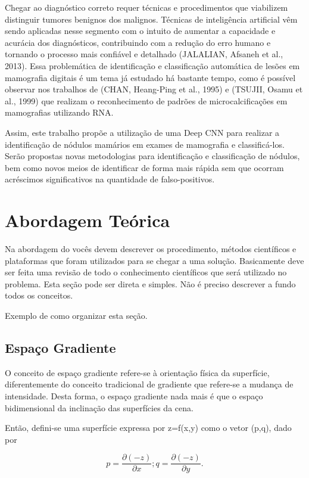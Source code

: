 \documentclass[
	12pt,				%
	openright,			%
	oneside,			%
	a4paper,			%
	brazil,				%
	]{abntex2}
\begin{document}
    Chegar ao diagnóstico correto requer técnicas e procedimentos que viabilizem distinguir tumores benignos dos malignos. Técnicas de inteligência artificial vêm sendo aplicadas nesse segmento com o intuito de aumentar a capacidade e acurácia dos diagnósticos, contribuindo com a redução do erro humano e tornando o processo mais confiável e detalhado (JALALIAN, Afsaneh et al., 2013). 
    Essa problemática de identificação e classificação automática de lesões em mamografia digitais é um tema já estudado há bastante tempo, como é possível observar nos trabalhos de (CHAN, Heang-Ping et al., 1995) e (TSUJII, Osamu et al., 1999) que realizam o reconhecimento de padrões de microcalcificações em mamografias utilizando RNA.
    
    Assim, este trabalho propõe a utilização de uma Deep CNN para realizar a identificação de nódulos mamários em exames de mamografia e classificá-los. Serão propostas novas metodologias para identificação e classificação de nódulos, bem como novos meios de identificar de forma mais rápida sem que ocorram acréscimos significativos na quantidade de falso-positivos. 
    
\chapter{Abordagem Teórica}\label{Teoria}

Na abordagem do vocês devem descrever os procedimento, métodos científicos e plataformas que foram utilizados para se chegar a uma solução. Basicamente deve ser feita uma revisão de todo o conhecimento científicos que será utilizado no problema. Esta seção pode ser direta e simples. Não é preciso descrever a fundo todos os conceitos.

Exemplo de como organizar esta seção.

\section{Espaço Gradiente}

    O conceito de espaço gradiente refere-se à orientação física da superfície, diferentemente do conceito tradicional de gradiente que refere-se a mudança de intensidade. Desta forma, o espaço gradiente nada mais é que o espaço bidimensional da inclinação das superfícies da cena. 
    
Então, defini-se uma superfície expressa por z=f(x,y) como o vetor (p,q), dado por

\begin{equation} 
p = \frac{\partial(-z)}{\partial x}; q=\frac{\partial(-z)}{\partial y}.
\label{eq:gradiente}
\end{equation}
\end{document}

